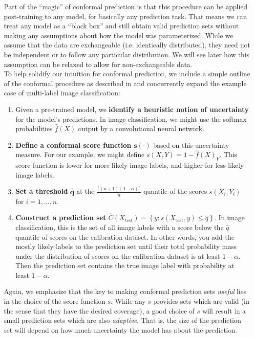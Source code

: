 \documentclass[a4paper, 12pt]{article}
\begin{document}
Part of the ``magic'' of conformal prediction is that this procedure can be applied
post-training to any model, for basically any prediction task. That means we can treat any
model as a ``black box'' and still obtain valid prediction sets without making any assumptions
about how the model was parameterized. While we assume that the data are exchangeable (i.e. identically distributed),
they need not be independent or to follow any particular distribution. We will see later
how this assumption can be relaxed to allow for non-exchangeable data. \\
To help solidify our intuition for conformal prediction, we include a simple outline of the conformal
procedure as described in \autocite{angelopoulosGentleIntroductionConformal2022} and concurrently expand the example case of
multi-label image classification:
\begin{enumerate}
    \item Given a pre-trained model, we \textbf{identify a heuristic notion of uncertainty} for the model's predictions. In image classification, we might use the softmax probabilities $\hat{f}(X)$ output by a convolutional neural network.
    \item \textbf{Define a conformal score function $\bm{s(\cdot)}$} based on this uncertainty measure. For our example, we might define $s(X, Y)=1-\hat{f}(X)_Y$. This score function is lower for more likely image labels, and higher for less likely image labels.
    \item \textbf{Set a threshold} $\bm{\hat{q}}$ at the $ \frac{\lceil (n+1)(1-\alpha) \rceil }{n}$ quantile of the scores $s(X_i, Y_i)$ for $i = 1, \ldots, n$.
    \item \textbf{Construct a prediction set} $\hat{C}(X_{\text{test}}) = \left\{ y: s(X_{\text{test}}, y) \leq \hat{q} \right\}$.
          In image classification, this is the set of all image labels with a score below the $\hat{q}$ quantile of scores on the calibration dataset. In other words,
          you add the mostly likely labels to the prediction set until their total probability mass under the distribution of scores on the calibration dataset is at least $1-\alpha$. Then
          the prediction set contains the true image label with probability at least $1-\alpha$.
\end{enumerate}
Again, we emphasize that the key to making conformal prediction sets \textit{useful}
lies in the choice of the score function $s$. While any $s$ provides sets which are valid
(in the sense that they have the desired coverage), a good choice of $s$ will result in a small prediction sets
which are also \textit{adaptive}. That is, the size of the prediction set will depend on how much uncertainty
the model has about the prediction.
\end{document}
